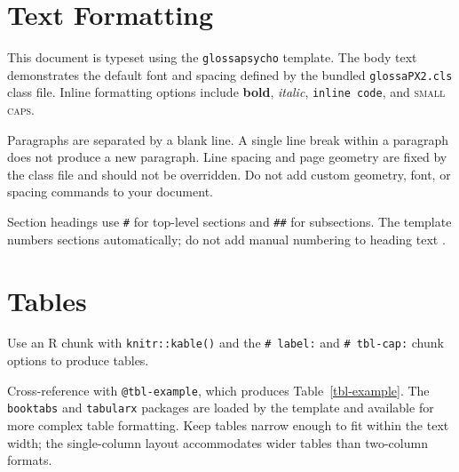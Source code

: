\documentclass[
    a4paper,
    man,
    floatsintext
]{glossaPX2}
\begin{document}
\section{Text Formatting}\label{text-formatting}

This document is typeset using the \texttt{glossapsycho} template. The
body text demonstrates the default font and spacing defined by the
bundled \texttt{glossaPX2.cls} class file. Inline formatting options
include \textbf{bold}, \emph{italic}, \texttt{inline\ code}, and
\textsc{small caps}.

Paragraphs are separated by a blank line. A single line break within a
paragraph does not produce a new paragraph. Line spacing and page
geometry are fixed by the class file and should not be overridden. Do
not add custom geometry, font, or spacing commands to your document.

Section headings use \texttt{\#} for top-level sections and
\texttt{\#\#} for subsections. The template numbers sections
automatically; do not add manual numbering to heading text
\autocite{Smith2020}.

\section{Tables}\label{tables}

Use an R chunk with \texttt{knitr::kable()} and the
\texttt{\#\textbar{}\ label:} and \texttt{\#\textbar{}\ tbl-cap:} chunk
options to produce tables.

\begin{table}


\caption{\label{tbl-example}A simple table showing condition means.}

\end{table}%

Cross-reference with \texttt{@tbl-example}, which produces
Table~\ref{tbl-example}. The \texttt{booktabs} and \texttt{tabularx}
packages are loaded by the template and available for more complex table
formatting. Keep tables narrow enough to fit within the text width; the
single-column layout accommodates wider tables than two-column formats.
\end{document}
